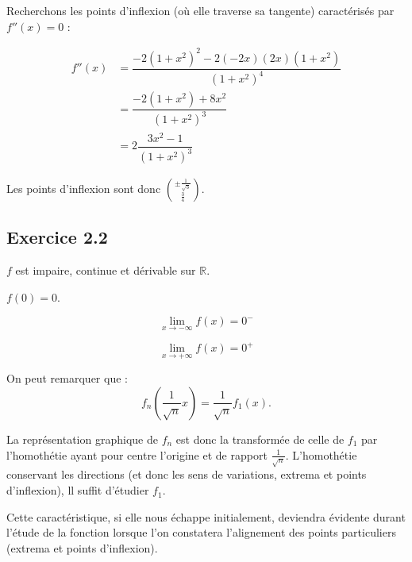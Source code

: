 \documentclass{report}
\begin{document}
Recherchons les points d'inflexion (où elle traverse sa tangente) caractérisés par $f''(x)=0$ :

\begin{equation*}
	\begin{split}
		f''(x) &= \dfrac{-2(1+x^2)^2-2(-2x)(2x)(1+x^2)}{(1+x^2)^4} \\
		       &= \dfrac{-2(1+x^2)+8x^2}{(1+x^2)^3} \\
		       &= 2\dfrac{3x^2-1}{(1+x^2)^3} 
	\end{split}
\end{equation*}

Les points d'inflexion sont donc $\binom{\pm\frac{1}{\sqrt{3}}}{\frac{3}{4}}$.



\subsection*{Exercice 2.2}

$f$ est impaire, continue et dérivable sur $\mathbb{R}$.

$f(0) = 0$.

\begin{displaymath}
\lim_{x \rightarrow -\infty} f(x) = 0^{-}
\end{displaymath}

\begin{displaymath}
	\lim_{x \rightarrow +\infty} f(x) = 0^{+}
\end{displaymath}

On peut remarquer que :
\begin{displaymath}
	f_n\left(\frac{1}{\sqrt{n}} x \right) = \frac{1}{\sqrt{n}} f_1(x).
\end{displaymath}

La représentation graphique de $f_n$ est donc la transformée de celle de $f_1$
par l'homothétie ayant pour centre l'origine et de rapport $\frac{1}{\sqrt{n}}$.
L'homothétie conservant les directions (et donc les sens de variations, extrema et
points d'inflexion), ll suffit d'étudier $f_1$.

Cette caractéristique, si elle nous échappe initialement, deviendra évidente durant
l'étude de la fonction lorsque l'on constatera l'alignement des points particuliers
(extrema et points d'inflexion).
\end{document}
